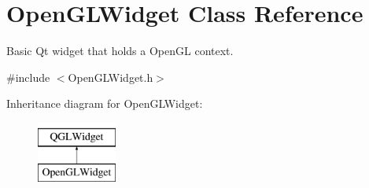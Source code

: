 \hypertarget{class_open_g_l_widget}{\section{Open\-G\-L\-Widget Class Reference}
\label{class_open_g_l_widget}
}


Basic Qt widget that holds a Open\-G\-L context.  




{\ttfamily \#include $<$Open\-G\-L\-Widget.\-h$>$}

Inheritance diagram for Open\-G\-L\-Widget\-:\begin{figure}[H]
\begin{center}
\leavevmode
\includegraphics[height=2.000000cm]{class_open_g_l_widget}
\end{center}
\end{figure}
